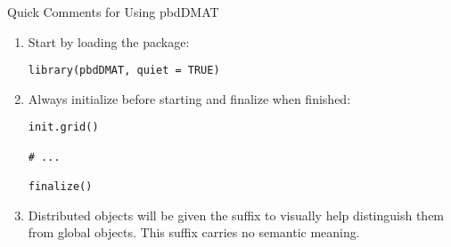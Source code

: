 \begin{frame}[fragile]
  \begin{block}{Quick Comments for Using pbdDMAT}\pause
    \begin{enumerate}
      \item Start by loading the package:
\vspace{-.4cm}
\begin{lstlisting}
library(pbdDMAT, quiet = TRUE)
\end{lstlisting}
      \item Always initialize before starting and finalize when finished:
\vspace{-.4cm}
\begin{lstlisting}
init.grid()

# ...

finalize()
\end{lstlisting}
      \item   Distributed  objects will be given the suffix  to visually 
help 
distinguish them from global objects.  This suffix carries no semantic meaning.
    \end{enumerate}
  \end{block}
\end{frame}